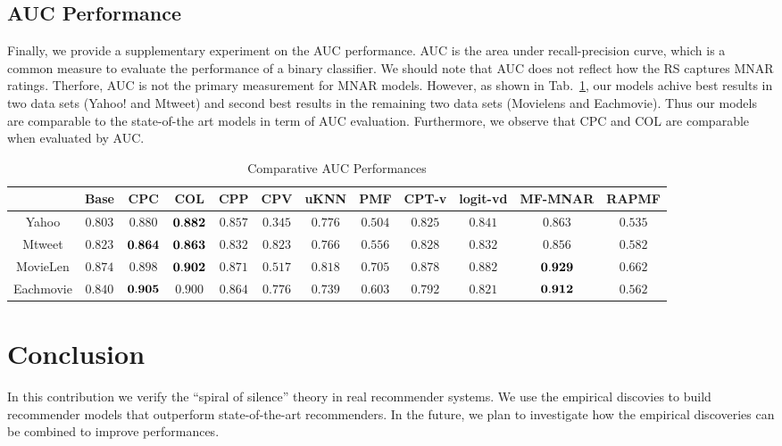 \documentclass{sig-alternate}
\begin{document}
\subsection{AUC Performance}
Finally, we provide a supplementary experiment on the AUC performance. AUC is the area under recall-precision curve, which is a common measure to evaluate the performance of a binary classifier. We should note that AUC does not reflect how the RS captures MNAR ratings. Therfore, AUC is not the primary measurement for MNAR models. However, as shown in Tab.~\ref{tab:AUC}, our models achive best results in two data sets (Yahoo! and Mtweet) and second best results in the remaining two data sets (Movielens and Eachmovie). Thus our models are comparable to the state-of-the art models in term of AUC evaluation. Furthermore, we observe that CPC and COL are comparable when evaluated by AUC.   

\begin{table}[htbp]
\centering
\caption{Comparative AUC Performances}\label{tab:AUC}
\centering
\begin{tabular}{|c|c|c|c|c|c|c|c|c|c|c|c|}
\hline
& Base & CPC & COL & CPP & CPV & uKNN & PMF & CPT-v & logit-vd & MF-MNAR & RAPMF \\\hline
\hline
Yahoo & $0.803$ & $0.880$ & $\bf{0.882}$ & $0.857$ & $0.345$ & $0.776$ & $0.504$ & $0.825$ & $0.841$ & $0.863$ & $0.535$ \\\hline
Mtweet & $0.823$ & $\bf{0.864}$ & $\bf{0.863}$ & $0.832$ & $0.823$ & $0.766$ & $0.556$ & $0.828$ & $0.832$ & $0.856$ & $0.582$ \\\hline
MovieLen & $0.874$ & $0.898$ & $\bf{0.902}$ & $0.871$ & $0.517$ & $0.818$ & $0.705$ & $0.878$ & $0.882$ & $\bf{0.929}$ & $0.662$ \\\hline
Eachmovie & $0.840$ & $\bf{0.905}$ & $0.900$ & $0.864$ & $0.776$ & $0.739$ & $0.603$ & $0.792$ & $0.821$ & $\bf{0.912}$ & $0.562$ \\\hline
\end{tabular}
\end{table}

\section{Conclusion}\label{sec:conclusion}

In this contribution we verify the ``spiral of silence'' theory in real recommender systems. We use the empirical discovies to build recommender models that outperform state-of-the-art recommenders. In the future, we plan to investigate how the empirical discoveries can be combined to improve performances.
\end{document}
